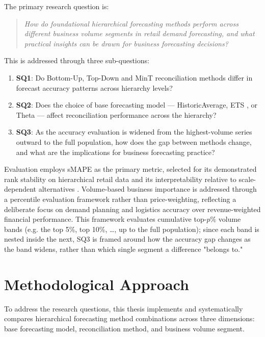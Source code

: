 The primary research question is:

\begin{quote}
	\textit{How do foundational hierarchical forecasting methods perform across different business volume segments in retail demand forecasting, and what practical insights can be drawn for business forecasting decisions?}
\end{quote}

This is addressed through three sub-questions:

\begin{enumerate}
	\item \textbf{SQ1}: Do Bottom-Up, Top-Down and MinT reconciliation methods differ in forecast accuracy patterns across hierarchy levels?
	\item \textbf{SQ2}: Does the choice of base forecasting model — HistoricAverage, ETS \cite{Hyndman:2008}, or Theta \cite{Assimakopoulos:2000} — affect reconciliation performance across the hierarchy?
	\item \textbf{SQ3}: As the accuracy evaluation is widened from the highest-volume series outward to the full population, how does the gap between methods change, and what are the implications for business forecasting practice?
\end{enumerate}

Evaluation employs sMAPE as the primary metric, selected for its demonstrated rank stability on hierarchical retail data and its interpretability relative to scale-dependent alternatives \cite{Hewamalage:2021}. Volume-based business importance is addressed through a percentile evaluation framework rather than price-weighting, reflecting a deliberate focus on demand planning and logistics accuracy over revenue-weighted financial performance. This framework evaluates cumulative top-$p\%$ volume bands (e.g. the top 5\%, top 10\%, \ldots, up to the full population); since each band is nested inside the next, SQ3 is framed around how the accuracy gap changes as the band widens, rather than which single segment a difference "belongs to."

\section{Methodological Approach}

To address the research questions, this thesis implements and systematically compares hierarchical forecasting method combinations across three dimensions: base forecasting model, reconciliation method, and business volume segment.

